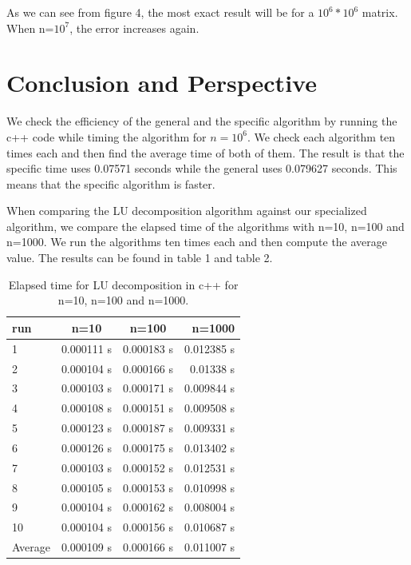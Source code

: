 \documentclass[%
oneside,                 %
final,                   %
10pt]{article}
\begin{document}
As we can see from figure 4, the most exact result will be for a $10^6*10^6$ matrix. When n=$10^7$, the error increases again.
\section{Conclusion and Perspective}

We check the efficiency of the general and the specific algorithm by running the c++ code while timing the algorithm for $n=10^6$. We check each algorithm ten times each and then find the average time of both of them. The result is that the specific time uses 0.07571 seconds while the general uses 0.079627 seconds. This means that the specific algorithm is faster. 

When comparing the LU decomposition algorithm against our specialized algorithm, we compare the elapsed time of the algorithms with n=10, n=100 and n=1000. We run the algorithms ten times each and then compute the average value. The results can be found in table 1 and table 2.

\begin{table}[H]
    \centering
    \begin{tabular}{|l|c|c|r|}
    \hline
     run & n=10 & n=100 & n=1000\\
     \hline
      1  & 0.000111 s & 0.000183 s & 0.012385 s\\
      2  & 0.000104 s & 0.000166 s & 0.01338 s\\
      3  & 0.000103 s & 0.000171 s & 0.009844 s\\
      4  & 0.000108 s & 0.000151 s & 0.009508 s\\
      5  & 0.000123 s & 0.000187 s & 0.009331 s\\
      6  & 0.000126 s & 0.000175 s & 0.013402 s\\
      7  & 0.000103 s & 0.000152 s & 0.012531 s\\
      8  & 0.000105 s & 0.000153 s & 0.010998 s\\
      9  & 0.000104 s & 0.000162 s & 0.008004 s\\
      10 & 0.000104 s & 0.000156 s & 0.010687 s\\
      \hline 
      Average & 0.000109 s & 0.000166 s & 0.011007 s\\
      \hline
    \end{tabular}
    \caption{Elapsed time for LU decomposition in c++ for n=10, n=100 and n=1000.}
    \label{tab:my_label}
\end{table}
\end{document}
